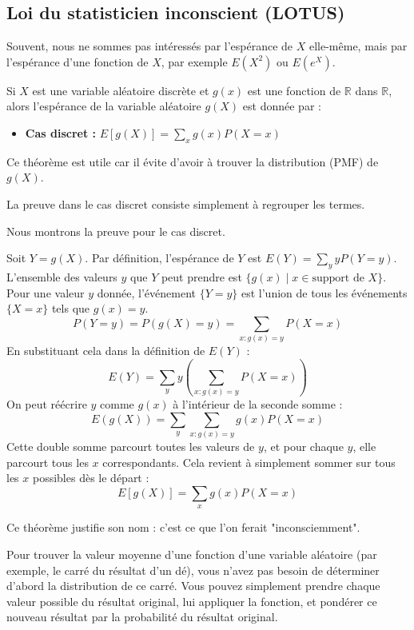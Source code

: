 \subsection{Loi du statisticien inconscient (LOTUS)}

Souvent, nous ne sommes pas intéressés par l'espérance de $X$ elle-même, mais par l'espérance d'une fonction de $X$, par exemple $E(X^2)$ ou $E(e^X)$.

\begin{theorembox}
Si $X$ est une variable aléatoire discrète et $g(x)$ est une fonction de $\mathbb{R}$ dans $\mathbb{R}$, alors l'espérance de la variable aléatoire $g(X)$ est donnée par :
\begin{itemize}
    \item \textbf{Cas discret :} $E[g(X)] = \sum_x g(x) P(X=x)$
\end{itemize}
Ce théorème est utile car il évite d'avoir à trouver la distribution (PMF) de $g(X)$.
\end{theorembox}

La preuve dans le cas discret consiste simplement à regrouper les termes.

\begin{proofbox}
Nous montrons la preuve pour le cas discret.

Soit $Y = g(X)$. Par définition, l'espérance de $Y$ est $E(Y) = \sum_y y P(Y=y)$.
L'ensemble des valeurs $y$ que $Y$ peut prendre est $\{g(x) \mid x \in \text{support de } X\}$.
Pour une valeur $y$ donnée, l'événement $\{Y=y\}$ est l'union de tous les événements $\{X=x\}$ tels que $g(x)=y$.
$$P(Y=y) = P(g(X)=y) = \sum_{x: g(x)=y} P(X=x)$$
En substituant cela dans la définition de $E(Y)$ :
$$E(Y) = \sum_y y \left( \sum_{x: g(x)=y} P(X=x) \right)$$
On peut réécrire $y$ comme $g(x)$ à l'intérieur de la seconde somme :
$$E(g(X)) = \sum_y \sum_{x: g(x)=y} g(x) P(X=x)$$
Cette double somme parcourt toutes les valeurs de $y$, et pour chaque $y$, elle parcourt tous les $x$ correspondants. Cela revient à simplement sommer sur tous les $x$ possibles dès le départ :
$$E[g(X)] = \sum_x g(x) P(X=x)$$
\end{proofbox}

Ce théorème justifie son nom : c'est ce que l'on ferait "inconsciemment".

\begin{intuitionbox}
Pour trouver la valeur moyenne d'une fonction d'une variable aléatoire (par exemple, le carré du résultat d'un dé), vous n'avez pas besoin de déterminer d'abord la distribution de ce carré. Vous pouvez simplement prendre chaque valeur possible du résultat original, lui appliquer la fonction, et pondérer ce nouveau résultat par la probabilité du résultat original.
\end{intuitionbox}

